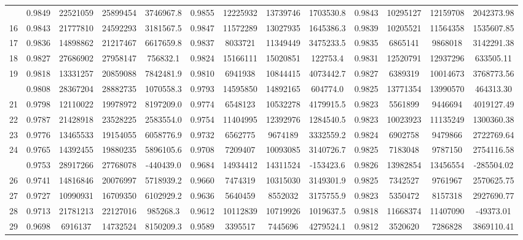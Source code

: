 \documentclass[
  12pt,
]{article}
\begin{document}
\begin{longtable}[t]{lcccccccccccc}
\addlinespace
15 & 0.9849 & 22521059 & 25899454 & 3746967.8 & 0.9855 & 12225932 & 13739746 & 1703530.8 & 0.9843 & 10295127 & 12159708 & 2042373.98\\
16 & 0.9843 & 21777810 & 24592293 & 3181567.5 & 0.9847 & 11572289 & 13027935 & 1645386.3 & 0.9839 & 10205521 & 11564358 & 1535607.85\\
17 & 0.9836 & 14898862 & 21217467 & 6617659.8 & 0.9837 & 8033721 & 11349449 & 3475233.5 & 0.9835 & 6865141 & 9868018 & 3142291.38\\
18 & 0.9827 & 27686902 & 27958147 & 756832.1 & 0.9824 & 15166111 & 15020851 & 122753.4 & 0.9831 & 12520791 & 12937296 & 633505.11\\
19 & 0.9818 & 13331257 & 20859088 & 7842481.9 & 0.9810 & 6941938 & 10844415 & 4073442.7 & 0.9827 & 6389319 & 10014673 & 3768773.56\\
\addlinespace
20 & 0.9808 & 28367204 & 28882735 & 1070558.3 & 0.9793 & 14595850 & 14892165 & 604774.0 & 0.9825 & 13771354 & 13990570 & 464313.30\\
21 & 0.9798 & 12110022 & 19978972 & 8197209.0 & 0.9774 & 6548123 & 10532278 & 4179915.5 & 0.9823 & 5561899 & 9446694 & 4019127.49\\
22 & 0.9787 & 21428918 & 23528225 & 2583554.0 & 0.9754 & 11404995 & 12392976 & 1284540.5 & 0.9823 & 10023923 & 11135249 & 1300360.38\\
23 & 0.9776 & 13465533 & 19154055 & 6058776.9 & 0.9732 & 6562775 & 9674189 & 3332559.2 & 0.9824 & 6902758 & 9479866 & 2722769.64\\
24 & 0.9765 & 14392455 & 19880235 & 5896105.6 & 0.9708 & 7209407 & 10093085 & 3140726.7 & 0.9825 & 7183048 & 9787150 & 2754116.58\\
\addlinespace
25 & 0.9753 & 28917266 & 27768078 & -440439.0 & 0.9684 & 14934412 & 14311524 & -153423.6 & 0.9826 & 13982854 & 13456554 & -285504.02\\
26 & 0.9741 & 14816846 & 20076997 & 5718939.2 & 0.9660 & 7474319 & 10315030 & 3149301.9 & 0.9825 & 7342527 & 9761967 & 2570625.75\\
27 & 0.9727 & 10990931 & 16709350 & 6102929.2 & 0.9636 & 5640459 & 8552032 & 3175755.9 & 0.9823 & 5350472 & 8157318 & 2927690.77\\
28 & 0.9713 & 21781213 & 22127016 & 985268.3 & 0.9612 & 10112839 & 10719926 & 1019637.5 & 0.9818 & 11668374 & 11407090 & -49373.01\\
29 & 0.9698 & 6916137 & 14732524 & 8150209.3 & 0.9589 & 3395517 & 7445696 & 4279524.1 & 0.9812 & 3520620 & 7286828 & 3869110.41\\

\end{longtable}
\end{document}
